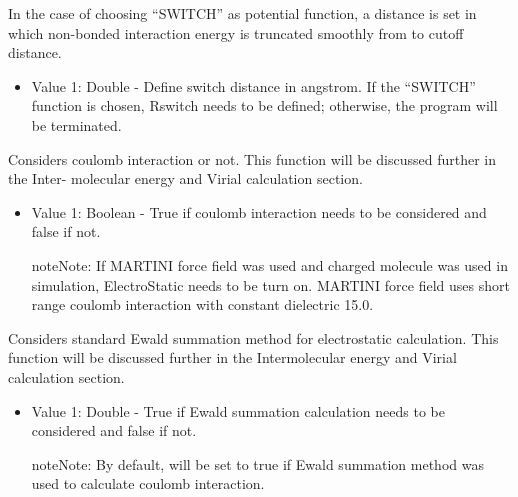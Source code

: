 \documentclass[letterpaper,10pt,english]{sphinxmanual}
\begin{document}
\begin{description}
\begin{itemize}
\end{itemize}

\item[{\sphinxcode{\sphinxupquote{Rswitch}}}] \leavevmode
In the case of choosing “SWITCH” as potential function, a distance is set in which non-bonded interaction energy is truncated smoothly from to cutoff distance.
\begin{itemize}
\item {} 
Value 1: Double - Define switch distance in angstrom. If the “SWITCH” function is chosen, Rswitch needs to be defined; otherwise, the program will be terminated.

\end{itemize}

\item[{\sphinxcode{\sphinxupquote{ElectroStatic}}}] \leavevmode
Considers coulomb interaction or not. This function will be discussed further in the Inter- molecular energy and Virial calculation section.
\begin{itemize}
\item {} 
Value 1: Boolean - True if coulomb interaction needs to be considered and false if not.

\begin{sphinxadmonition}{note}{Note:}
If MARTINI force field was used and charged molecule was used in simulation, ElectroStatic needs to be turn on. MARTINI force field uses short range coulomb interaction with constant dielectric 15.0.
\end{sphinxadmonition}

\end{itemize}

\item[{\sphinxcode{\sphinxupquote{Ewald}}}] \leavevmode
Considers standard Ewald summation method for electrostatic calculation. This function will be discussed further in the Intermolecular energy and Virial calculation section.
\begin{itemize}
\item {} 
Value 1: Double - True if Ewald summation calculation needs to be considered and false if not.

\begin{sphinxadmonition}{note}{Note:}
By default,  will be set to true if Ewald summation method was used to calculate coulomb interaction.
\end{sphinxadmonition}

\end{itemize}


\end{description}
\end{document}
